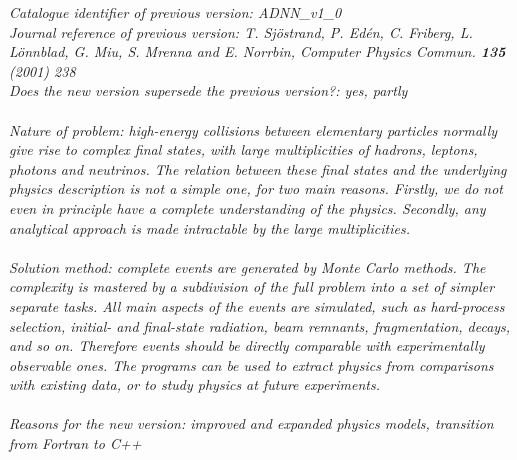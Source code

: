\documentclass{elsartmod}
\begin{document}
\begin{small}
{\em Catalogue identifier of previous version: ADNN\_v1\_0}       \\
{\em Journal reference of previous version: T. Sj\"ostrand, P. Ed\'en, 
C. Friberg, L. L\"onnblad, G. Miu, S. Mrenna and E. Norrbin, 
Computer Physics Commun. {\bf 135} (2001) 238}                  \\
{\em Does the new version supersede the previous version?: yes, partly} \\
    \\
{\em Nature of problem: high-energy collisions between 
elementary particles normally give rise to complex final states,
with large multiplicities of hadrons, leptons, photons and neutrinos.
The relation between these final states and the underlying 
physics description is not a simple one, for two main reasons. 
Firstly, we do not even in principle have a complete understanding 
of the physics. Secondly, any analytical approach is made 
intractable by the large multiplicities.  }\\
   \\
{\em Solution method: complete events are generated by Monte Carlo 
methods. The complexity is mastered by a subdivision of the full 
problem into a set of simpler separate tasks.
All main aspects of the events are simulated, such as
hard-process selection, initial- and final-state radiation, beam
remnants, fragmentation, decays, and so on. Therefore events should be
directly comparable with experimentally observable ones. The programs
can be used to extract physics from comparisons with existing
data, or to study physics at future experiments.}\\
   \\
{\em Reasons for the new version: improved and expanded physics models,
transition from Fortran to C++}\\
   \\

\end{small}
\end{document}
